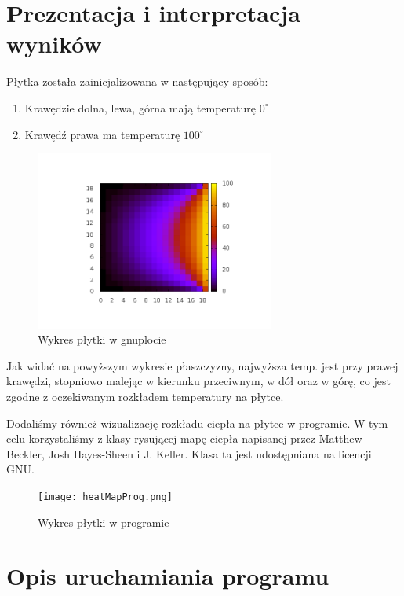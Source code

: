 \documentclass[11pt,a4paper]{article}
\begin{document}
\section{Prezentacja i interpretacja wyników}

Płytka została zainicjalizowana w następujący sposób:
\begin{enumerate}
	\item Krawędzie dolna, lewa, górna mają temperaturę $0^{\circ}$
	\item Krawędź prawa ma temperaturę $100^{\circ}$
\end{enumerate}

\begin{figure}[H]
\begin{center}
\includegraphics[width=0.7\textwidth]{grid.png}
\caption{Wykres płytki w gnuplocie}
\end{center}
\end{figure}

Jak widać na powyższym wykresie płaszczyzny, najwyższa temp. jest przy prawej krawędzi, stopniowo malejąc w kierunku przeciwnym, w dół oraz w górę, co jest zgodne z oczekiwanym rozkładem temperatury na płytce.

Dodaliśmy również wizualizację rozkładu ciepła na płytce w programie. W tym celu korzystaliśmy z klasy rysującej mapę ciepła napisanej przez Matthew Beckler, Josh Hayes-Sheen i J. Keller. Klasa ta jest udostępniana na licencji GNU. 

\begin{figure}[H]
\begin{center}
\texttt{[image: heatMapProg.png]}
\caption{Wykres płytki w programie}
\end{center}
\end{figure}

\section{Opis uruchamiania programu}
\end{document}
